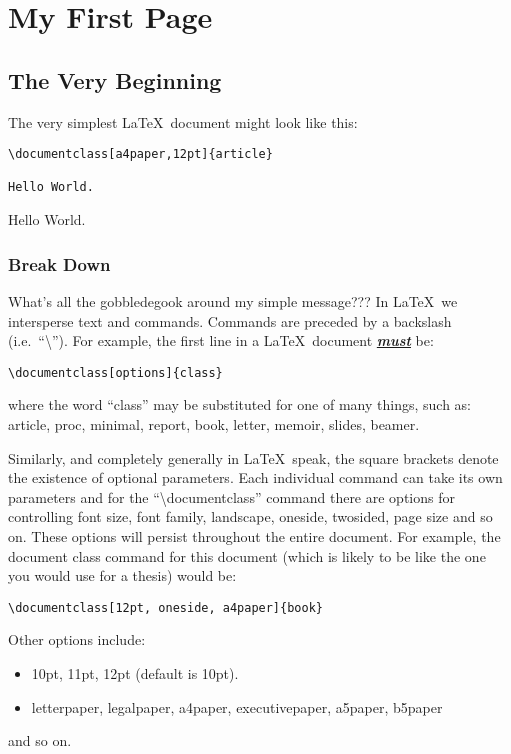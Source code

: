 \chapter{My First Page\label{chap:myFirstPage}}

\section{The Very Beginning}
The very simplest \LaTeX\ document might look like this:

\begin{verbatim}
\documentclass[a4paper,12pt]{article}

Hello World.

\end{verbatim}

\pagebreak
\thispagestyle{empty}
Hello World.
\pagebreak
\subsection{Break Down}
What's all the gobbledegook around my simple message??? In \LaTeX\ we intersperse text and commands. Commands are preceded by a backslash (i.e.~``\textbackslash''). For example, the first line in a \LaTeX\ document \underline{\textbf{\emph{must}}} be:

\begin{verbatim}
\documentclass[options]{class}
\end{verbatim}
where the word ``class'' may be substituted for one of many things, such as: article, proc, minimal, report, book, letter, memoir, slides, beamer.

Similarly, and completely generally in \LaTeX\ speak, the square brackets denote the existence of optional parameters. Each individual command can take its own parameters and for the ``{\textbackslash}documentclass'' command there are options for controlling font size, font family, landscape, oneside, twosided, page size and so on. These options will persist throughout the entire document. For example, the document class command for this document (which is likely to be like the one you would use for a thesis) would be:

\begin{verbatim}
\documentclass[12pt, oneside, a4paper]{book}
\end{verbatim}

Other options include:
\begin{itemize}
\item {10pt, 11pt, 12pt (default is 10pt).}
\item {letterpaper, legalpaper, a4paper, executivepaper, a5paper, b5paper}
\end{itemize}
and so on.

